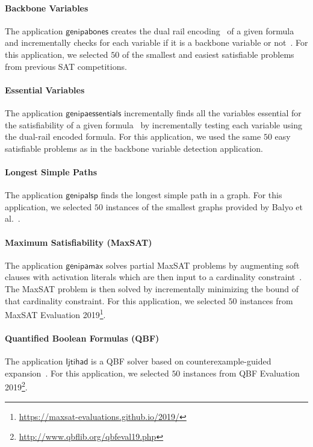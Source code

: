 \documentclass{elsarticle}
\begin{document}
\paragraph{Backbone Variables}

The application $\mathsf{genipabones}$ creates the dual rail encoding~\cite{Balyo:2015:SATRace} of a given formula and incrementally checks for each variable if it is a backbone variable or not~\cite{Janota:2015:Backbones}. 
For this application, we selected $50$ of the smallest and easiest satisfiable problems from previous SAT competitions. 

\paragraph{Essential Variables}

The application $\mathsf{genipaessentials}$ incrementally finds all the variables essential for the satisfiability of a given formula~\cite{Bryant:1987:Essentials} by incrementally testing each variable using the dual-rail encoded formula. 
For this application, we used the same $50$ easy satisfiable problems as in the backbone variable detection application. 

\paragraph{Longest Simple Paths}

The application $\mathsf{genipalsp}$ finds the longest simple path in a graph. 
For this application, we selected $50$ instances of the smallest graphs provided by Balyo et al.~\cite{Balyo:2019:LSP}. 

\paragraph{Maximum Satisfiability (MaxSAT)}

The application $\mathsf{genipamax}$ solves partial MaxSAT problems by augmenting soft clauses with activation literals which are then input to a cardinality constraint~\cite{Philipp:2015:PBLib}. The MaxSAT problem is then solved by incrementally minimizing the bound of that cardinality constraint. 
For this application, we selected $50$ instances from MaxSAT Evaluation 2019\footnote{\url{https://maxsat-evaluations.github.io/2019/}}. 

\paragraph{Quantified Boolean Formulas (QBF)}
The application $\mathsf{Ijtihad}$ is a QBF solver based on counterexample-guided expansion~\cite{Bloem:2018:QBFSAT}. For this application, we selected $50$ instances from QBF Evaluation 2019\footnote{\url{http://www.qbflib.org/qbfeval19.php}}. 
\end{document}
